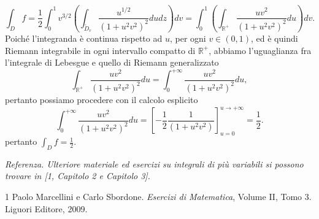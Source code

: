 \begin{enumerate}
		\[
		\int_D f = \frac{1}{2} \int_0^1 v^{3/2} \left(\int_{\tilde{D}_v} \frac{u^{1/2}}{(1 + u^2 v^2)^2} du dz\right) dv = \int_0^1 \left(\int_{\mathbb{R}^+} \frac{u v^2}{(1 + u^2 v^2)^2} du\right) dv.
		\]
		Poiché l'integranda è continua rispetto ad $u$, per ogni $v \in (0,1)$, ed è quindi Riemann integrabile in ogni intervallo compatto di $\mathbb{R}^+$, abbiamo l'uguaglianza fra l'integrale di Lebesgue e quello di Riemann generalizzato
		\[
		\int_{\mathbb{R}^+} \frac{u v^2}{(1 + u^2 v^2)^2} du = \int_0^{+\infty} \frac{u v^2}{(1 + u^2 v^2)^2} du,
		\]
		pertanto possiamo procedere con il calcolo esplicito
		\[
		\int_0^{+\infty} \frac{u v^2}{(1 + u^2 v^2)^2} du = \left[-\frac{1}{2} \frac{1}{(1 + u^2 v^2)}\right]_{u=0}^{u \to +\infty} = \frac{1}{2}.
		\]
		pertanto $\int_D f = \frac{1}{2}$.
	
\end{enumerate}

\textit{Referenza. Ulteriore materiale ed esercizi su integrali di più variabili si possono trovare in [1, Capitolo 2 e Capitolo 3].}

\begin{thebibliography}{1}
	 Paolo Marcellini e Carlo Sbordone. \textit{Esercizi di Matematica}, Volume II, Tomo 3. Liguori Editore, 2009.
\end{thebibliography}